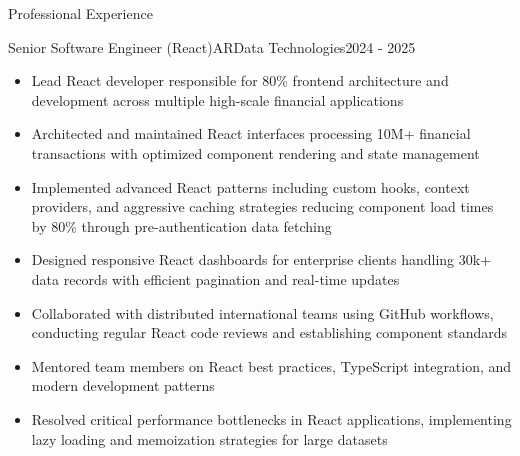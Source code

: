\documentclass[]{mcdowellcv}
\begin{document}
	\begin{cvsection}{Professional Experience}
		\begin{cvsubsection}{Senior Software Engineer (React)}{ARData Technologies}{2024 - 2025}		
			\begin{itemize}
        \item Lead React developer responsible for 80\% frontend architecture and development across multiple high-scale financial applications
        \item Architected and maintained React interfaces processing 10M+ financial transactions with optimized component rendering and state management
        \item Implemented advanced React patterns including custom hooks, context providers, and aggressive caching strategies reducing component load times by 80\% through pre-authentication data fetching
        \item Designed responsive React dashboards for enterprise clients handling 30k+ data records with efficient pagination and real-time updates
        \item Collaborated with distributed international teams using GitHub workflows, conducting regular React code reviews and establishing component standards
        \item Mentored team members on React best practices, TypeScript integration, and modern development patterns
        \item Resolved critical performance bottlenecks in React applications, implementing lazy loading and memoization strategies for large datasets
			\end{itemize}
		\end{cvsubsection}

		\pagebreak
		

\end{cvsection}
\end{document}
